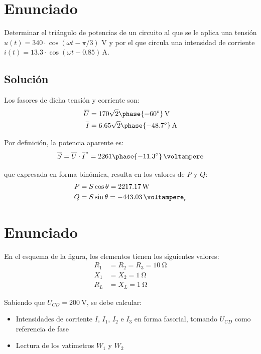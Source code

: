 
\section{Enunciado}

Determinar el triángulo de potencias de un circuito al que se le
aplica una tensión $u(t)=340 \cdot \cos(\omega t - \pi/3)$ V y
por el que circula una intensidad de corriente
$i(t)= 13.3 \cdot \cos(\omega t-0.85)\,\si{\ampere}$.

\subsection*{Solución}

Los fasores de dicha tensión y corriente son:
\begin{align*}
  \overline{U} &= 170 \sqrt{2}\phase{\ang{-60}}\,\si{\volt}\\
  \overline{I} &= 6.65\sqrt{2}\phase{\ang{-48.7}}\,\si{\ampere}
\end{align*}

Por definición, la potencia aparente es:
\begin{equation*}
  \overline{S} = \overline{U}\cdot\overline{I}^* = 2261\phase{\ang{-11.3}}\,\si{\voltampere}
\end{equation*}

que expresada en forma binómica, resulta en los valores de $P$ y $Q$:
\begin{align*}
  P &= S \cos \theta = \qty{2217.17}{\watt}\\
  Q &= S \sin \theta = \qty{-443.03}{\voltampere_r}
\end{align*}


\section{Enunciado}

En el esquema de la figura, los elementos tienen los siguientes valores:
\begin{align*}
  R_1 &= R_2 = R_3 = \qty{10}{\ohm}\\
  X_1 &= X_2 = \qty{1}{\ohm}\\
  R_L &= X_L = \qty{1}{\ohm}
\end{align*}

Sabiendo que $U_{CD} = \qty{200}{\volt}$, se debe calcular:
    \begin{itemize}
    \item Intensidades de corriente $I$, $I_1$, $I_2$ e $I_3$ {en forma
        fasorial}, tomando $U_{CD}$ como referencia de fase
    \item Lectura de los vatímetros $W_1$ y $W_2$
    \end{itemize}
    
